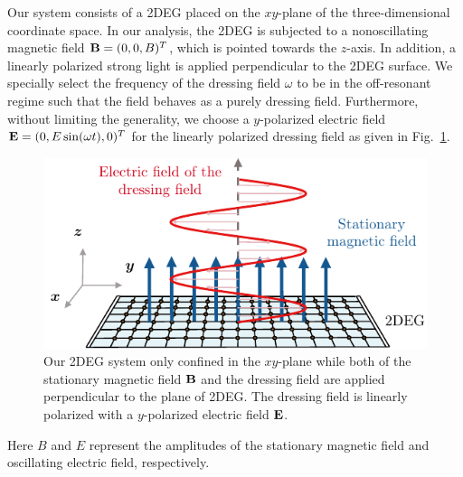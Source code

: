 \documentclass[
 reprint,
 amsmath,amssymb,
 aps,
 prb,
]{revtex4-2}
\begin{document}
Our system consists of a 2DEG placed on the $xy$-plane of the three-dimensional coordinate space. In our analysis, the 2DEG is subjected to a nonoscillating magnetic field $\vb{B} = (0,0,B)^{T}$, which is pointed towards the $z$-axis. In addition, a linearly polarized strong light is applied perpendicular to the 2DEG surface. We specially select the frequency of the dressing field $\omega$ to be in the off-resonant regime such that the field behaves as a purely dressing field. Furthermore, without limiting the generality, we choose a $y$-polarized electric field $\vb{E} = (0,E\sin(\omega t),0)^{T}$ for the linearly polarized dressing field as given in Fig.~\ref{fig:1}.
\begin{figure}[b]
\includegraphics[scale=0.9]{figures/fig_1.pdf}
\caption{\label{fig:1} Our 2DEG system only confined in the $xy$-plane while both of the stationary magnetic field $\vb{B}$ and the dressing field are applied perpendicular to the plane of 2DEG. The dressing field is linearly polarized with a $y$-polarized electric field $\vb{E}$.}
\end{figure}
Here $B$ and $E$ represent the amplitudes of the stationary magnetic field and oscillating electric field, respectively.
\end{document}
